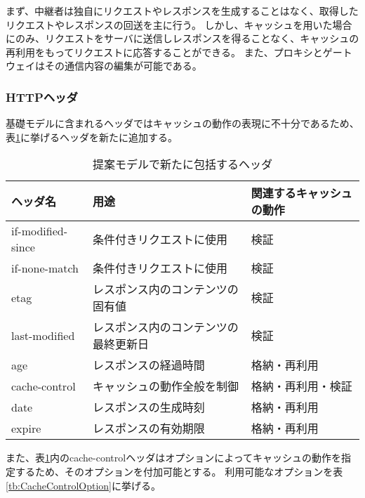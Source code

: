 \documentclass[12pt,a4paper]{jbook}
\begin{document}
まず、中継者は独自にリクエストやレスポンスを生成することはなく、取得したリクエストやレスポンスの回送を主に行う。
しかし、キャッシュを用いた場合にのみ、リクエストをサーバに送信しレスポンスを得ることなく、キャッシュの再利用をもってリクエストに応答することができる。
また、プロキシとゲートウェイはその通信内容の編集が可能である。

\subsubsection{HTTPヘッダ}
基礎モデルに含まれるヘッダではキャッシュの動作の表現に不十分であるため、表\ref{tb:ProposedModel-Headers}に挙げるヘッダを新たに追加する。

\begin{table}[htb]
\centering
\caption{提案モデルで新たに包括するヘッダ}
\label{tb:ProposedModel-Headers}
\begin{tabular}{lll}
ヘッダ名 & 用途 & 関連するキャッシュの動作 \\ \hline
if-modified-since & 条件付きリクエストに使用 & 検証 \\
if-none-match & 条件付きリクエストに使用 & 検証 \\
etag & レスポンス内のコンテンツの固有値 & 検証 \\
last-modified & レスポンス内のコンテンツの最終更新日 & 検証 \\
age & レスポンスの経過時間 & 格納・再利用 \\
cache-control & キャッシュの動作全般を制御 & 格納・再利用・検証 \\
date & レスポンスの生成時刻 & 格納・再利用 \\
expire & レスポンスの有効期限 & 格納・再利用 \\
\end{tabular}
\end{table}

また、表\ref{tb:ProposedModel-Headers}内のcache-controlヘッダはオプションによってキャッシュの動作を指定するため、そのオプションを付加可能とする。
利用可能なオプションを表\ref{tb:CacheControlOption}に挙げる。
\end{document}
